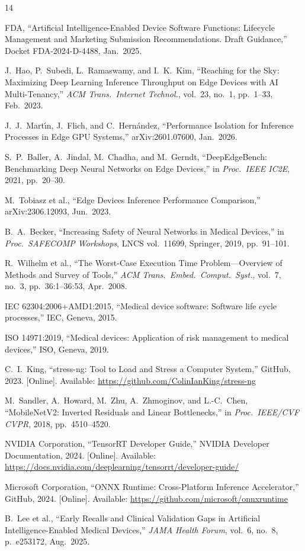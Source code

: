 \documentclass[11pt]{article}
\begin{document}
\begin{thebibliography}{14}

FDA, ``Artificial Intelligence-Enabled Device Software Functions: Lifecycle Management
and Marketing Submission Recommendations. Draft Guidance,''
Docket FDA-2024-D-4488, Jan.\ 2025.

J.~Hao, P.~Subedi, L.~Ramaswamy, and I.~K.~Kim, ``Reaching for the Sky: Maximizing
Deep Learning Inference Throughput on Edge Devices with AI Multi-Tenancy,''
\textit{ACM Trans.\ Internet Technol.}, vol.\ 23, no.\ 1, pp.\ 1--33, Feb.\ 2023.

J.~J.~Mart\'{\i}n, J.~Flich, and C.~Hern\'{a}ndez,
``Performance Isolation for Inference Processes in Edge GPU Systems,''
arXiv:2601.07600, Jan.\ 2026.

S.~P.~Baller, A.~Jindal, M.~Chadha, and M.~Gerndt,
``DeepEdgeBench: Benchmarking Deep Neural Networks on Edge Devices,''
in \textit{Proc.\ IEEE IC2E}, 2021, pp.\ 20--30.

M.~Tobiasz et al., ``Edge Devices Inference Performance Comparison,''
arXiv:2306.12093, Jun.\ 2023.

B.~A.~Becker, ``Increasing Safety of Neural Networks in Medical Devices,''
in \textit{Proc.\ SAFECOMP Workshops}, LNCS vol.\ 11699, Springer, 2019,
pp.\ 91--101.

R.~Wilhelm et al., ``The Worst-Case Execution Time Problem---Overview of Methods
and Survey of Tools,'' \textit{ACM Trans.\ Embed.\ Comput.\ Syst.}, vol.\ 7, no.\ 3,
pp.\ 36:1--36:53, Apr.\ 2008.

IEC 62304:2006+AMD1:2015, ``Medical device software: Software life cycle processes,''
IEC, Geneva, 2015.

ISO 14971:2019, ``Medical devices: Application of risk management to medical devices,''
ISO, Geneva, 2019.

C.~I.~King, ``stress-ng: Tool to Load and Stress a Computer System,''
GitHub, 2023. [Online]. Available: \url{https://github.com/ColinIanKing/stress-ng}

M.~Sandler, A.~Howard, M.~Zhu, A.~Zhmoginov, and L.-C.~Chen,
``MobileNetV2: Inverted Residuals and Linear Bottlenecks,''
in \textit{Proc.\ IEEE/CVF CVPR}, 2018, pp.\ 4510--4520.

NVIDIA Corporation, ``TensorRT Developer Guide,'' NVIDIA Developer Documentation,
2024. [Online]. Available: \url{https://docs.nvidia.com/deeplearning/tensorrt/developer-guide/}

Microsoft Corporation, ``ONNX Runtime: Cross-Platform Inference Accelerator,''
GitHub, 2024. [Online]. Available: \url{https://github.com/microsoft/onnxruntime}

B.~Lee et al., ``Early Recalls and Clinical Validation Gaps in Artificial
Intelligence-Enabled Medical Devices,'' \textit{JAMA Health Forum}, vol.\ 6,
no.\ 8, p.\ e253172, Aug.\ 2025.

\end{thebibliography}
\end{document}
